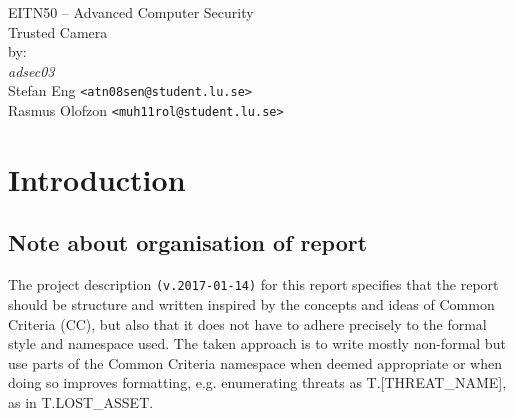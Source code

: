 \documentclass[10pt]{article}
\begin{document}

  \thispagestyle{empty}
  \vspace*{3cm}
  \begin{center}
    \huge{EITN50 -- Advanced Computer Security} \\
    \vspace{0.3cm}
    \LARGE{Trusted Camera} \\
    \vspace{1cm}
    \large{by: \\ \vspace{0.2cm}
	\textit{adsec03} \\
        Stefan Eng \texttt{<atn08sen@student.lu.se>} \\
        Rasmus Olofzon \texttt{<muh11rol@student.lu.se>}
        } \\
  \end{center}


  \newpage

  \section{Introduction}



    \subsection{Note about organisation of report}
      { \footnotesize The project description \texttt{(v.2017-01-14)} for this report
      specifies that the report should be structure and written inspired by the
      concepts and ideas of Common Criteria (CC), but also that it does not
      have to adhere precisely to the formal style and namespace used.  The
      taken approach is to write mostly non-formal but use parts of the Common
      Criteria namespace when deemed appropriate or when doing so improves
      formatting, e.g. enumerating threats as T.[THREAT\_NAME], as in T.LOST\_ASSET.
      }
\end{document}
